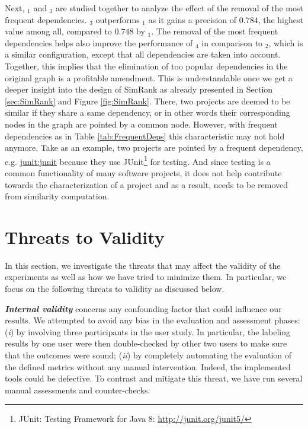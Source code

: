 Next, \CrossSimA$_{1}$ and \CrossSimA$_{3}$ are studied together to analyze the effect of the removal of the most frequent dependencies. \CrossSimA$_{3}$ outperforms \CrossSimA$_{1}$ as it gains a precision of $0.784$, the highest value among all, compared to $0.748$ by \CrossSimA$_{1}$. The removal of the most frequent dependencies helps also improve the performance of \CrossSimA$_{4}$ in comparison to \CrossSimA$_{2}$, which is a similar configuration, except that all dependencies are taken into account. Together, this implies that the elimination of too popular dependencies in the original graph is a profitable amendment. This is understandable once we get a deeper insight into the design of SimRank as already presented in Section \ref{sec:SimRank} and Figure \ref{fig:SimRank}. There, two projects are deemed to be similar if they share a same dependency, or in other words their corresponding nodes in the graph are pointed by a common node. However, with frequent dependencies as in Table \ref{tab:FrequentDeps} this characteristic may not hold anymore. Take as an example, two projects are pointed by a frequent dependency, e.g. \href{https://mvnrepository.com/artifact/junit/junit}{junit:junit} because they use JUnit\footnote{JUnit: Testing Framework for Java 8: \url{http://junit.org/junit5/}} for testing. And since testing is a common functionality of many software projects, it does not help contribute towards the characterization of a project and as a result, needs to be removed from similarity computation. 





\section{Threats to Validity}\label{sec:threatsValidity}

In this section, we investigate the threats that may affect the validity of the experiments as well as how we have tried to minimize them. In particular, we focus on the following threats to validity as discussed below. %

\textit{\textbf{Internal validity}}  concerns any confounding factor that could influence our results.  We attempted to avoid any bias in the evaluation and assessment
phases: (\emph{i}) by involving three participants in the user study. In particular, the labeling results by one user were then double-checked by other two users to make sure that the outcomes were sound; (\emph{ii}) by completely automating the evaluation of the defined metrics without any manual intervention. Indeed, the implemented tools could be defective. To contrast and mitigate this threat, we have run several manual assessments and counter-checks.

